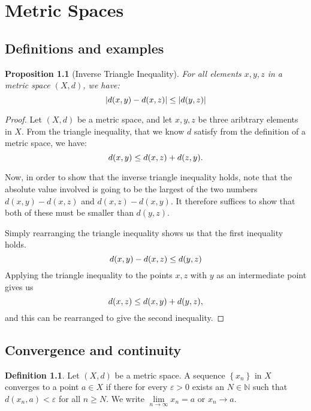 \documentclass[a4paper]{report}
\newtheorem{prp}{Proposition}
\theoremstyle{definition}
\newtheorem{defn}{Definition}
\begin{document}
\chapter{Metric Spaces}
\section{Definitions and examples}

\begin{prp}[Inverse Triangle Inequality]
  For all elements $x, y, z$ in a metric space $\left(X, d\right)$, we have:
  \begin{equation}
    \notag
    |d(x, y) - d(x, z)| \leq |d(y, z)|
  \end{equation}
\end{prp}

\begin{proof}
  Let $(X, d)$ be a metric space, and let $x, y, z$ be three aribtrary elements
  in $X$.  From the triangle inequality, that we know $d$ satisfy from the
  definition of a metric space, we have:
  \begin{equation}
    \notag
    d(x, y) \leq d(x, z) + d(z, y).
  \end{equation}

  Now, in order to show that the inverse triangle inequality holds, note that
  the absolute value involved is going to be the largest of the two numbers
  $d(x, y) - d(x, z)$ and $d(x, z) - d(x, y)$. It therefore suffices to show
  that both of these must be smaller than $d(y, z)$. 
  
  Simply rearranging the triangle inequality shows us that the first inequality
  holds.
  \begin{equation}
    \notag
    d(x, y) - d(x, z) \leq d(y, z)
  \end{equation}
  Applying the triangle inequality to the points $x, z$ with $y$ as an
  intermediate point gives us
  \begin{equation}
    \notag
    d(x, z) \leq d(x, y) + d(y, z),
  \end{equation}
  and this can be rearranged to give the second inequality.
\end{proof}

\section{Convergence and continuity}
\begin{defn}
  Let $(X, d)$ be a metric space. A sequence $\left\{ x_n \right\}$ in $X$
  converges to a point $a \in X$ if there for every $\varepsilon > 0$ exists an
  $N \in \mathbb{N}$ such that $d(x_{n}, a) < \varepsilon$ for all $n \geq N$.
  We write $\lim\limits_{n\rightarrow \infty} x_n = a$ or $x_{n} \rightarrow a$.
\end{defn}
\end{document}

